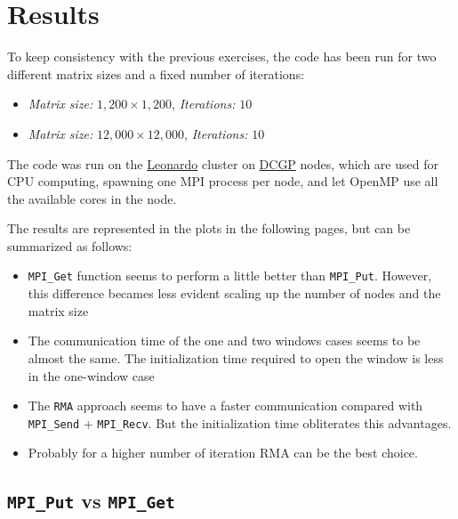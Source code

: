 \documentclass{article}
\begin{document}
    \section{Results}

    To keep consistency with the previous exercises, the code has been run for two different matrix sizes and a fixed number of iterations:

    \begin{itemize}
        \itemsep0em
        \item \textit{Matrix size:} $1,200 \times 1,200$, \textit{Iterations:} $10$
        \item \textit{Matrix size:} $12,000 \times 12,000$, \textit{Iterations:} $10$
    \end{itemize}

    The code was run on the \href{https://leonardo-supercomputer.cineca.eu/}{Leonardo} cluster on \href{https://wiki.u-gov.it/confluence/display/SCAIUS/UG3.2.2%3A+LEONARDO+DCGP+UserGuide}{DCGP} nodes, which are used for CPU computing, spawning one MPI process per node, and let OpenMP use all the available cores in the node.

    The results are represented in the plots in the following pages, but can be summarized as follows:

    \begin{itemize}
        \itemsep0em
       \item \texttt{MPI\_Get} function seems to perform a little better than \texttt{MPI\_Put}. However, this difference becames less evident scaling up the number of nodes and the matrix size
        \item The communication time of the one and two windows cases seems to be almost the same. The initialization time required to open the window is less in the one-window case
        \item The \texttt{RMA} approach seems to have a faster communication compared with \texttt{MPI\_Send} + \texttt{MPI\_Recv}. But the initialization time obliterates this advantages.
        \item Probably for a higher number of iteration RMA can be the best choice.
    \end{itemize}

    \newpage

    \subsection{\texttt{MPI\_Put} vs \texttt{MPI\_Get}}
\end{document}
